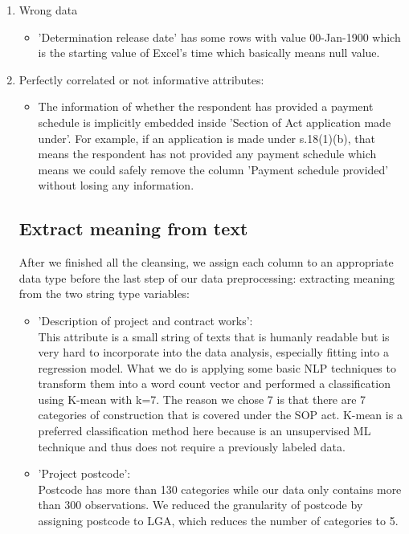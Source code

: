 \documentclass[12pt, b4paper]{article}
\begin{document}
\begin{enumerate}
\begin{itemize}
        \end{itemize}
      \item Wrong data
        \begin{itemize}
          \item 'Determination release date' has some rows with value 00-Jan-1900 which is the starting value of Excel's time which basically means null value. 
        \end{itemize}
      \item Perfectly correlated or not informative attributes: 
        \begin{itemize}
          \item The information of whether the respondent has provided a payment schedule is implicitly embedded inside 'Section of Act application made under'. For example, if an application is made under s.18(1)(b), that means the respondent has not provided any payment schedule which means we could safely remove the column 'Payment schedule provided' without losing any information.
        \end{itemize}
    \subsection{Extract meaning from text}
    After we finished all the cleansing, we assign each column to an appropriate data type before the last step of our data preprocessing: extracting meaning from the two string type variables:  
      \begin{itemize}
        \item 'Description of project and contract works': \\
          This attribute is a small string of texts that is humanly readable but is very hard to incorporate into the data analysis, especially fitting into a regression model. What we do is applying some basic NLP techniques to transform them into a word count vector and performed a classification using K-mean with k=7. The reason we chose 7 is that there are 7 categories of construction that is covered under the SOP act. K-mean is a preferred classification method here because is an unsupervised ML technique and thus does not require a previously labeled data.
        \item 'Project postcode': \\
          Postcode has more than 130 categories while our data only contains more than 300 observations. We reduced the granularity of postcode by assigning postcode to LGA, which reduces the number of categories to 5. 
      \end{itemize}

    \end{enumerate}
\end{document}
